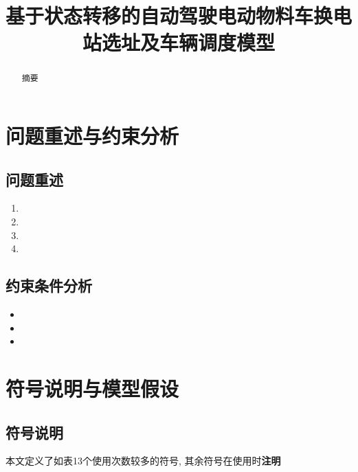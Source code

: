 \documentclass[withoutpreface,bwprint]{cumcmthesis} %
\title{基于状态转移的自动驾驶电动物料车换电站选址及车辆调度模型}
\begin{document}
	
	\maketitle
	\begin{abstract}
		摘要
		
		
		\quad
		
		
\end{abstract}


\newpage

\setcounter{page}{1}    

\section{问题重述与约束分析}
\subsection{问题重述}



\begin{enumerate}
	\item 
	\item 
	\item 
	\item 
\end{enumerate}



\subsection{约束条件分析}

\begin{itemize}
	\item
	\item 
	\item 
\end{itemize}
 

\section{符号说明与模型假设}
\subsection{符号说明}
本文定义了如表13个使用次数较多的符号, 其余符号在使用时\textbf{注明}
\end{document}
